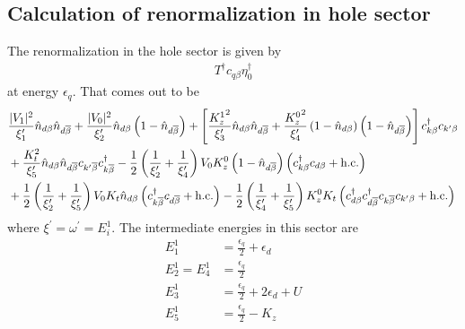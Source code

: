 \documentclass[12pt,twoside]{report}
\numberwithin{equation}{section}
\begin{document}
\subsection{Calculation of renormalization in hole sector}
The renormalization in the hole sector is given by
\begin{equation}\begin{aligned}
	T^\dagger c_{q\beta}\eta_0^\dagger
\end{aligned}\end{equation}
at energy \(\epsilon_q\). That comes out to be
\begin{equation}\begin{aligned}
&\frac{|V_1|^2}{\xi^\prime_1}\hat n_{d\beta}\hat n_{d\overline\beta} + \frac{|V_0|^2}{\xi^\prime_2}\hat n_{d\beta}\left(1 - \hat n_{d\overline\beta}\right) + \left[\frac{{K_z^1}^2}{\xi^\prime_3}\hat n_{d\beta}\hat n_{d\overline\beta} + \frac{{K_z^0}^2}{\xi^\prime_4}\left(1 - \hat n_{d\beta}\right)\left(1 - \hat n_{d\overline\beta}\right)\right]c^\dagger_{k\beta}c_{k^\prime\beta}\\
&+\frac{K_t^2}{\xi^\prime_5}\hat n_{d\beta}\hat n_{d\overline\beta}c_{k^\prime\overline\beta}c^\dagger_{k\overline\beta} - \frac{1}{2}\left(\frac{1}{\xi^\prime_2} + \frac{1}{\xi^\prime_4}\right)V_0 K_z^0\left(1 - \hat n_{d\overline\beta}\right)\left(c^\dagger_{k\beta}c_{d\beta} + \text{h.c.}\right) \\
&+ \frac{1}{2}\left(\frac{1}{\xi^\prime_2} + \frac{1}{\xi^\prime_5}\right)V_0 K_t\hat n_{d\beta}\left(c^\dagger_{k\overline\beta}c_{d\overline\beta} + \text{h.c.}\right) - \frac{1}{2}\left(\frac{1}{\xi^\prime_4} + \frac{1}{\xi^\prime_5}\right)K_z^0 K_t\left(c^\dagger_{d\beta}c^\dagger_{d\overline\beta}c_{k\overline\beta}c_{k^\prime\beta} + \text{h.c.}\right) 
\end{aligned}\end{equation}
where \(\xi^\prime = \omega^\prime = E_i^1\). The intermediate energies in this sector are
\begin{equation}\begin{aligned}
	E^1_1 &= \frac{\epsilon_q}{2} + \epsilon_d\\
	E^1_2 = E_4^1 &= \frac{\epsilon_q}{2}\\
	E^1_3 &= \frac{\epsilon_q}{2} + 2\epsilon_d + U\\
	E_5^1 &= \frac{\epsilon_q}{2} - K_z\\
\end{aligned}\end{equation}
\end{document}
